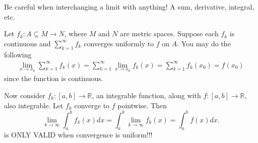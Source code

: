 \documentclass[11pt]{article}
\theoremstyle{definition}
\newcommand{\R}{\mathbb{R}}                      %
\begin{document}
\note Be careful when interchanging a limit with anything! A sum, derivative, integral, etc. 

\ex Let $f_k:A\subseteq M\to N$, where $M$ and $N$ are metric spaces. Suppose each $f_k$ is continuous and $\sum_{k=1}^\infty f_k$ converges uniformly to $f$ on $A$. You may do the following
\begin{align*}
    \lim_{x\to x_0} \sum_{k=1}^\infty f_k(x)=\sum_{k=1}^\infty \lim_{x\to x_0} f_k(x)=\sum_{k=1}^\infty f_k(x_0)=f(x_0)
\end{align*}
since the function is continuous.

Now consider $f_k:[a,b]\to \R$, an integrable function, along with $f:[a,b]\to \R$, also integrable. Let $f_k$ converge to $f$ pointwise. Then
$$
\lim_{k\to\infty}\int_a^b f_k(x)dx = \int_a^b\lim_{k\to \infty} f_k(x)=\int_a^b f(x)dx.
$$
is ONLY VALID when convergence is uniform!!!
\end{document}
